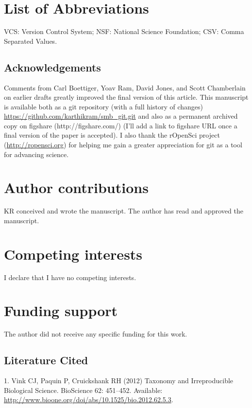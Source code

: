 \documentclass[]{article}
\begin{document}
\section{List of Abbreviations}

VCS: Version Control System; NSF: National Science Foundation; CSV:
Comma Separated Values.

\subsection{Acknowledgements}

Comments from Carl Boettiger, Yoav Ram, David Jones, and Scott
Chamberlain on earlier drafts greatly improved the final version of this
article. This manuscript is available both as a git repository (with a
full history of changes)
\href{https://github.com/karthikram/smb\_git.git}{https://github.com/karthikram/smb\_git.git}
and also as a permanent archived copy on figshare (http://figshare.com/)
(I'll add a link to figshare URL once a final version of the paper is
accepted). I also thank the rOpenSci project
(\href{http://ropensci.org}{http://ropensci.org}) for helping me gain a
greater appreciation for git as a tool for advancing science.

\section{Author contributions}

KR conceived and wrote the manuscript. The author has read and approved
the manuscript.

\section{Competing interests}

I declare that I have no competing interests.

\section{Funding support}

The author did not receive any specific funding for this work.

\subsection{Literature Cited}

1. Vink CJ, Paquin P, Cruickshank RH (2012) Taxonomy and Irreproducible
Biological Science. BioScience 62: 451--452. Available:
\href{http://www.bioone.org/doi/abs/10.1525/bio.2012.62.5.3}{http://www.bioone.org/doi/abs/10.1525/bio.2012.62.5.3}.
\end{document}
